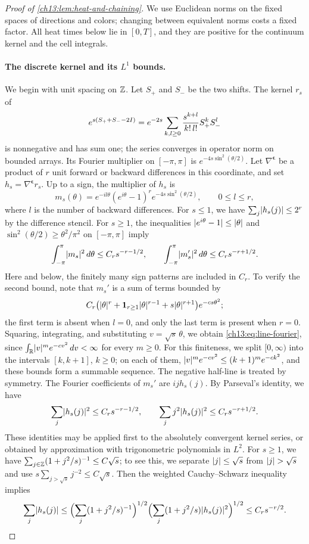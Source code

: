 \begin{proof}[Proof of \cref{ch13:lem:heat-and-chaining}]
We use Euclidean norms on the fixed spaces of directions and colors; changing between equivalent norms costs a fixed factor. All heat times below lie in $[0,T]$, and they are positive for the continuum kernel and the cell integrals. 

\paragraph{The discrete kernel and its $L^1$ bounds.}
We begin with unit spacing on $\mathbb Z$. Let $S_+$ and $S_-$ be the two shifts. The kernel $r_s$ of
\[
 e^{s(S_++S_--2I)}=e^{-2s}\sum_{k,l\ge0}\frac{s^{k+l}}{k!\,l!}S_+^kS_-^l
\]
is nonnegative and has sum one; the series converges in operator norm on bounded arrays. Its Fourier multiplier on $[-\pi,\pi]$ is $e^{-4s\sin^2(\theta/2)}$. Let $\nabla^{\boldsymbol\epsilon}$ be a product of $r$ unit forward or backward differences in this coordinate, and set $h_s=\nabla^{\boldsymbol\epsilon}r_s$. Up to a sign, the multiplier of $h_s$ is
\[
 m_s(\theta)=e^{-il\theta}(e^{i\theta}-1)^re^{-4s\sin^2(\theta/2)},\qquad0\le l\le r,
\]
where $l$ is the number of backward differences. For $s\le1$, we have $\sum_j\lvert h_s(j)\rvert\le2^r$ by the difference stencil. For $s\ge1$, the inequalities $\lvert e^{i\theta}-1\rvert\le\lvert \theta\rvert$ and $\sin^2(\theta/2)\ge\theta^2/\pi^2$ on $[-\pi,\pi]$ imply
\begin{equation}\label{ch13:eq:line-fourier}
 \int_{-\pi}^{\pi}\lvert m_s\rvert^2\,d\theta\le C_rs^{-r-1/2},\qquad
 \int_{-\pi}^{\pi}\lvert m_s'\rvert^2\,d\theta\le C_rs^{-r+1/2}.
\end{equation}
Here and below, the finitely many sign patterns are included in $C_r$. To verify the second bound, note that $m_s'$ is a sum of terms bounded by
\[
 C_r\bigl(\lvert \theta\rvert^r+\mathbf 1_{r\ge1}\lvert \theta\rvert^{r-1}+s\lvert \theta\rvert^{r+1}\bigr)e^{-cs\theta^2};
\]
the first term is absent when $l=0$, and only the last term is present when $r=0$. Squaring, integrating, and substituting $v=\sqrt s\,\theta$, we obtain \eqref{ch13:eq:line-fourier}, since $\int_\mathbb R\lvert v\rvert^me^{-cv^2}\,dv<\infty$ for every $m\ge0$. For this finiteness, we split $[0,\infty)$ into the intervals $[k,k+1]$, $k\ge0$; on each of them, $\lvert v\rvert^me^{-cv^2}\le(k+1)^me^{-ck^2}$, and these bounds form a summable sequence. The negative half-line is treated by symmetry. The Fourier coefficients of $m_s'$ are $ijh_s(j)$. By Parseval's identity, we have
\[
 \sum_j\lvert h_s(j)\rvert^2\le C_rs^{-r-1/2},\qquad\sum_jj^2\lvert h_s(j)\rvert^2\le C_rs^{-r+1/2}.
\]
These identities may be applied first to the absolutely convergent kernel series, or obtained by approximation with trigonometric polynomials in $L^2$. For $s\ge1$, we have $\sum_{j\in\mathbb Z}(1+j^2/s)^{-1}\le C\sqrt s$; to see this, we separate $\lvert j\rvert\le\sqrt s$ from $\lvert j\rvert>\sqrt s$ and use $s\sum_{j>\sqrt s}j^{-2}\le C\sqrt s$. Then the weighted Cauchy--Schwarz inequality implies
\begin{equation}\label{ch13:eq:line-lone}
 \sum_j\lvert h_s(j)\rvert
 \le\Bigl(\sum_j(1+j^2/s)^{-1}\Bigr)^{1/2}\Bigl(\sum_j(1+j^2/s)\lvert h_s(j)\rvert^2\Bigr)^{1/2}
 \le C_rs^{-r/2}.
\end{equation}


\end{proof}
